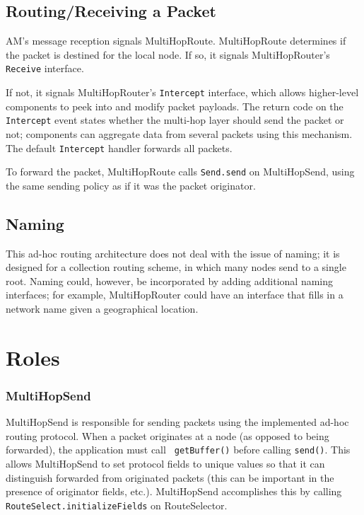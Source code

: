 \documentclass[10pt]{article}
\begin{document}
\subsection*{Routing/Receiving a Packet}

AM's message reception signals MultiHopRoute.  MultiHopRoute
determines if the packet is destined for the local node. If so, it
signals MultiHopRouter's {\tt Receive} interface.

If not, it signals MultiHopRouter's {\tt Intercept} interface, which
allows higher-level components to peek into and modify packet
payloads. The return code on the {\tt Intercept} event states whether
the multi-hop layer should send the packet or not; components can
aggregate data from several packets using this mechanism. The default
{\tt Intercept} handler forwards all packets.

To forward the packet, MultiHopRoute calls {\tt Send.send} on
MultiHopSend, using the same sending policy as if it was the packet
originator.

\subsection*{Naming}

This ad-hoc routing architecture does not deal with the issue of
naming; it is designed for a collection routing scheme, in which many
nodes send to a single root. Naming could, however, be incorporated by
adding additional naming interfaces; for example, MultiHopRouter could
have an interface that fills in a network name given a geographical
location.

\section*{Roles}

\subsubsection*{MultiHopSend}

MultiHopSend is responsible for sending packets using the implemented
ad-hoc routing protocol. When a packet originates at a node (as
opposed to being forwarded), the application must call {\tt
getBuffer()} before calling {\tt send()}. This allows MultiHopSend to
set protocol fields to unique values so that it can distinguish
forwarded from originated packets (this can be important in the
presence of originator fields, etc.). MultiHopSend accomplishes this
by calling {\tt RouteSelect.initializeFields} on RouteSelector.
\end{document}
